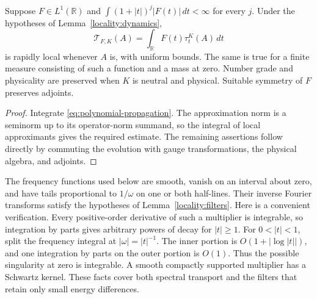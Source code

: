 \begin{lemma}\label{locality:filters}
Suppose $F\in L^1(\mathbb R)$ and
$\int(1+|t|)^j|F(t)|\,dt<\infty$ for every $j$.  Under the hypotheses
of Lemma~\ref{locality:dynamics},
\begin{equation}
 \mathcal T_{F,K}(A)=\int_{\mathbb R}F(t)\tau_t^K(A)\,dt
 \label{eq:time-filter}
\end{equation}
is rapidly local whenever $A$ is, with uniform bounds.  The same is
true for a finite measure consisting of such a function and a mass at
zero.  Number grade and physicality are preserved when $K$ is neutral
and physical.  Suitable symmetry of $F$ preserves adjoints.
\end{lemma}

\begin{proof}
Integrate \eqref{eq:polynomial-propagation}.  The approximation norm
is a seminorm up to its operator-norm summand, so the integral of local
approximants gives the required estimate.  The remaining assertions
follow directly by commuting the evolution with gauge transformations,
the physical algebra, and adjoints.
\end{proof}

The frequency functions used below are smooth, vanish on an interval
about zero, and have tails proportional to $1/\omega$ on one or both
half-lines.  Their inverse Fourier transforms satisfy the hypotheses
of Lemma~\ref{locality:filters}.  Here is a convenient verification.
Every positive-order derivative of such a multiplier is integrable,
so integration by parts gives arbitrary powers of decay for $|t|\geq1$.
For $0<|t|<1$, split the frequency integral at $|\omega|=|t|^{-1}$.
The inner portion is $O(1+|\log|t||)$, and one integration by parts
on the outer portion is $O(1)$.  Thus the possible singularity at
zero is integrable.  A smooth compactly supported multiplier has a
Schwartz kernel.  These facts cover both spectral transport and
the filters that retain only small energy differences.

